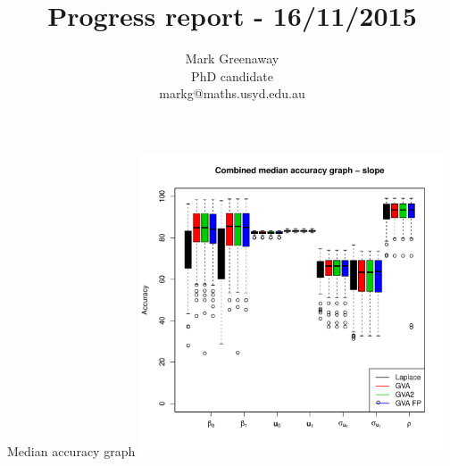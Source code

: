 \documentclass{beamer}
\title{Progress report - 16/11/2015}
\author{Mark Greenaway\\PhD candidate\\markg@maths.usyd.edu.au}
\begin{document}
\begin{frame}
	\maketitle
\end{frame}

\begin{frame}{Median accuracy graph}
	\includegraphics[width=90mm, height=90mm]{code/results/median_accuracy_combined_slope.pdf}
\end{frame}
\end{document}

